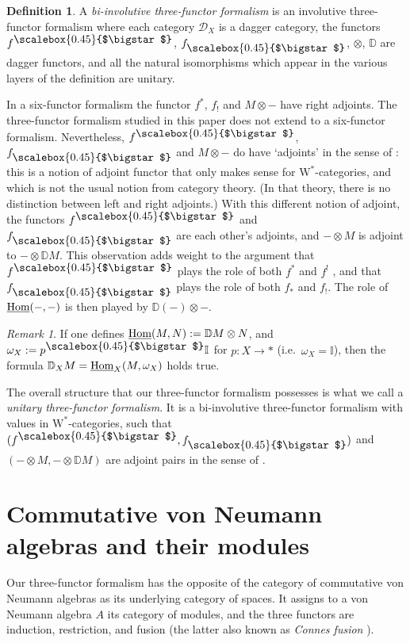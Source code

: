 \documentclass[10pt,a4paper,oneside]{amsart}
\theoremstyle{remark}
\newtheorem{remark}[theorem]{Remark}
\theoremstyle{definition}
\newtheorem{definition}[theorem]{Definition}
\newcommand{\Hom}{\textnormal{Hom}}
\newcommand{\smsq}{{\mathbin{\vcenter{\hbox{\scalebox{0.45}{$\bigstar$}}}}}}
\newcommand{\pull}[1]{#1^\smsq}
\newcommand{\push}[1]{#1_\smsq}
\begin{document}
\begin{definition}\label{def: biinv 3ff}
A \emph{bi-involutive three-functor formalism} is an involutive three-functor formalism where each category $\mathcal D_X$ is a dagger category, the functors $\pull{f}$, $\push{f}$, $\otimes$, $\mathbb D$ are dagger functors, and all the natural isomorphisms which appear in the various layers of the definition are unitary.
\end{definition}



In a {six}-functor formalism the functor $f^*$, $f_!$ and $M\otimes -$ have right adjoints. The three-functor formalism studied in this paper does not extend to a six-functor formalism.
    Nevertheless, $\pull{f}$, $\push{f}$ and $M\otimes -$ do have `adjoints' in the sense of \cite[Def~4.14]{Henriques2024}: this is a notion of adjoint functor that only makes sense for $\mathrm{W}^*$-categories, and which is not the usual notion from category theory.
    (In that theory, there is no distinction between left and right adjoints.)    
With this different notion of adjoint, the functors $\pull{f}$ and $\push{f}$ are each other's adjoints, and $-\otimes M$ is adjoint to $-\otimes \mathbb{D} M$.
This observation adds weight to the argument that $\pull{f}$ plays the role of both $f^*$ and $f^!$ , and that $\push{f}$ plays the role of both $f_*$ and $f_!$.
The role of $\underline{\Hom}(-,-)$ is then played by $\mathbb{D} (-)\otimes -$.

\begin{remark}
If one defines 
$\underline{\Hom}(M,N):=\mathbb{D}M\otimes N$, and $\omega_X:=\pull{p}\mathbb I$ for $p:X\to *$ (i.e.~$\omega_X=\mathbb I$), then the formula 
$\mathbb D_XM =\underline{\Hom}_X(M,\omega_X)$ holds true.
\end{remark}

The overall structure that our three-functor formalism possesses is what we call a \emph{unitary three-functor formalism}. It is a bi-involutive three-functor formalism with values in $\mathrm{W}^*$-categories, such that $(\pull{f},\push{f})$ and $(-\otimes M,-\otimes \mathbb{D} M)$ are adjoint pairs in the sense of \cite{Henriques2024}.


\section{Commutative von Neumann algebras and their modules}\label{sec:commvn}

Our three-functor formalism has the opposite of the category of commutative von Neumann algebras as its underlying category of spaces. It assigns to a von Neumann algebra $A$ its category of modules, and the three functors are induction, restriction, and fusion (the latter also known as \emph{Connes fusion} %
\cite{Wassermann1995}). 
\end{document}
